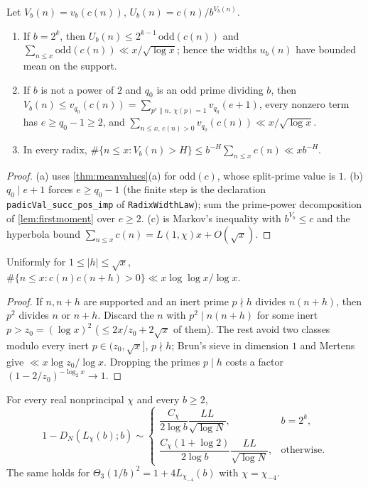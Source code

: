 \documentclass[11pt]{article}
\newcommand{\cnt}{\#}
\newcommand{\decl}[1]{\nolinkurl{#1}}
\begin{document}
\begin{lemma}\label{lem:valuations}
Let $V_b(n)=v_b(c(n))$, $U_b(n)=c(n)/b^{V_b(n)}$.
\begin{enumerate}[label=\textup{(\alph*)},nosep]
\item If $b=2^k$, then $U_b(n)\le2^{k-1}\,\mathrm{odd}(c(n))$ and
$\sum_{n\le x}\mathrm{odd}(c(n))\ll x/\sqrt{\log x}$; hence the widths $u_b(n)$ have bounded
mean on the support.
\item If $b$ is not a power of $2$ and $q_0$ is an odd prime dividing $b$, then
$V_b(n)\le v_{q_0}(c(n))=\sum_{p^e\|n,\ \chi(p)=1}v_{q_0}(e+1)$, every nonzero term has
$e\ge q_0-1\ge2$, and $\sum_{n\le x,\,c(n)>0}v_{q_0}(c(n))\ll x/\sqrt{\log x}$.
\item In every radix, $\cnt\{n\le x:V_b(n)>H\}\le b^{-H}\sum_{n\le x}c(n)\ll xb^{-H}$.
\end{enumerate}
\end{lemma}

\begin{proof}
(a) uses \cref{thm:meanvalues}(a) for $\mathrm{odd}(c)$, whose split-prime value is $1$.
(b) $q_0\mid e+1$ forces $e\ge q_0-1$ (the finite step is the declaration
\decl{padicVal_succ_pos_imp} of \texttt{RadixWidthLaw}); sum the prime-power decomposition of
\cref{lem:firstmoment} over $e\ge2$. (c) is Markov's inequality with $b^{V_b}\le c$ and the
hyperbola bound $\sum_{n\le x}c(n)=L(1,\chi)x+O(\sqrt x)$.
\end{proof}

\begin{lemma}[Pairs]\label{lem:pairs}
Uniformly for $1\le|h|\le\sqrt x$, $\cnt\{n\le x:c(n)c(n+h)>0\}\ll x\log\log x/\log x$.
\end{lemma}

\begin{proof}
If $n,n+h$ are supported and an inert prime $p\nmid h$ divides $n(n+h)$, then $p^2$ divides
$n$ or $n+h$. Discard the $n$ with $p^2\mid n(n+h)$ for some inert $p>z_0=(\log x)^2$
($\le2x/z_0+2\sqrt x$ of them). The rest avoid two classes modulo every inert
$p\in(z_0,\sqrt x]$, $p\nmid h$; Brun's sieve in dimension $1$ and Mertens give
$\ll x\log z_0/\log x$. Dropping the primes $p\mid h$ costs a factor
$(1-2/z_0)^{-\log_2x}\to1$.
\end{proof}

\begin{theorem}\label{thm:lambertradix}
For every real nonprincipal $\chi$ and every $b\ge2$,
\[
1-D_N(L_\chi(b);b)\sim
\begin{cases}\dfrac{C_\chi}{2\log b}\dfrac{LL}{\sqrt{\log N}},&b=2^k,\\[2ex]
\dfrac{C_\chi(1+\log2)}{2\log b}\dfrac{LL}{\sqrt{\log N}},&\text{otherwise.}\end{cases}
\]
The same holds for $\Theta_3(1/b)^2=1+4L_{\chi_{-4}}(b)$ with $\chi=\chi_{-4}$.
\end{theorem}
\end{document}
